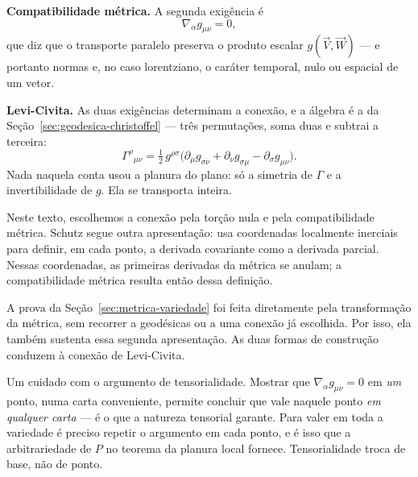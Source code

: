 \documentclass[12pt,a4paper,oneside]{book}
\theoremstyle{rgplain}
\theoremstyle{rgremark}
\begin{document}
\textbf{Compatibilidade métrica.} A segunda exigência é
\begin{equation}
  \nabla_\alpha g_{\mu\nu}=0 ,
  \label{eq:compat-variedade}
\end{equation}
que diz que o transporte paralelo preserva o produto escalar
$g(\vec V,\vec W)$ --- e portanto normas e, no caso lorentziano, o caráter
temporal, nulo ou espacial de um vetor.

\begin{resultado}
\textbf{Levi-Civita.} As duas exigências determinam a conexão, e a álgebra é a
da Seção~\ref{sec:geodesica-christoffel} --- três permutações, soma duas e
subtrai a terceira:
\begin{equation}
  \Gamma^\rho{}_{\mu\nu}
  =\tfrac12\,g^{\rho\sigma}\bigl(\partial_\mu g_{\sigma\nu}
  +\partial_\nu g_{\sigma\mu}-\partial_\sigma g_{\mu\nu}\bigr) .
  \label{eq:christoffel-variedade}
\end{equation}
Nada naquela conta usou a planura do plano: só a simetria de $\Gamma$ e a
invertibilidade de $g$. Ela se transporta inteira.
\end{resultado}

\begin{atencao}[title={\sffamily\bfseries\footnotesize\color{rgTerracota}DUAS FORMAS DE CONSTRUIR A CONEXÃO}]
Neste texto, escolhemos a conexão pela torção nula e pela compatibilidade
métrica. Schutz segue outra apresentação: usa coordenadas localmente inerciais
para definir, em cada ponto, a derivada covariante como a derivada parcial.
Nessas coordenadas, as primeiras derivadas da métrica se anulam; a
compatibilidade métrica resulta então dessa definição.

A prova da Seção~\ref{sec:metrica-variedade} foi feita diretamente pela
transformação da métrica, sem recorrer a geodésicas ou a uma conexão já
escolhida. Por isso, ela também sustenta essa segunda apresentação. As duas
formas de construção conduzem à conexão de Levi-Civita.
\end{atencao}

\begin{atencao}
Um cuidado com o argumento de tensorialidade. Mostrar que
$\nabla_\alpha g_{\mu\nu}=0$ em \emph{um} ponto, numa carta conveniente,
permite concluir que vale naquele ponto \emph{em qualquer carta} --- é o que a
natureza tensorial garante. Para valer em toda a variedade é preciso repetir o
argumento em cada ponto, e é isso que a arbitrariedade de $P$ no teorema da
planura local fornece. Tensorialidade troca de base, não de ponto.
\end{atencao}
\end{document}

